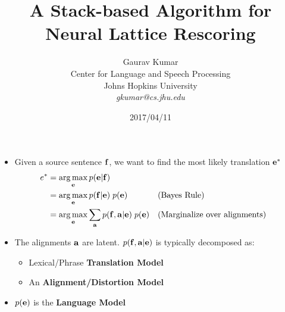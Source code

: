 \documentclass[landscape]{jhuslides3C}
\DeclareMathOperator*{\argmax}{arg\,max}
\begin{document}
 \rm
\title[Neural Lattice Rescoring]{A Stack-based Algorithm for Neural Lattice Rescoring}
\author[Gaurav Kumar]{Gaurav Kumar\\

Center for Language and Speech Processing \\ %
Johns Hopkins University\\
\medskip
\textit{gkumar@cs.jhu.edu} %
}
\date{2017/04/11}
\maketitle


\vspace{10mm}
\begin{itemize}
\item Given a source sentence $\bf f$, we want to find the most likely translation $\bf e^*$ 
\begin{align*}
e^* & = \argmax_{\bf e} p({\bf e}|{\bf f}) \\
& = \argmax_{\bf e} p({\bf f}|{\bf e}) \; p({\bf e}) && \text{(Bayes Rule)}\\
& = \argmax_{\bf e} \sum_{\bf a} p({\bf f}, {\bf a}|{\bf e}) \; p({\bf e}) && \text{(Marginalize over alignments)}
\end{align*}
\item The alignments ${\bf a}$ are latent. $p({\bf f}, {\bf a}|{\bf e})$ is typically decomposed as:
\begin{itemize}
\item Lexical/Phrase \textbf{Translation Model}
\item An \textbf{Alignment/Distortion Model}
\end{itemize}
\item $p({\bf e})$ is the \textbf{Language Model}
\end{itemize}

\end{document}
